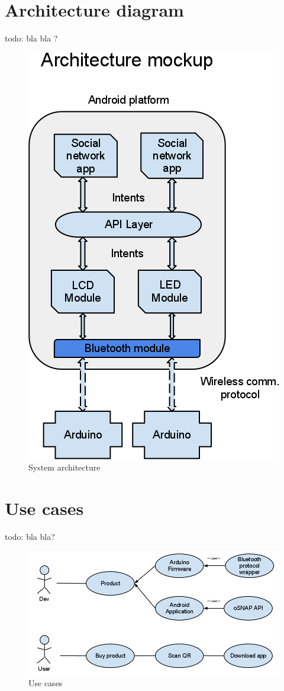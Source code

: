 \section{Architecture diagram}
todo: bla bla ?
\begin{figure}[hb!]
\centering \includegraphics[scale=0.50]{img/architecture-diagram.png}
\caption{System architecture}
\label{fig:architecture}
\end{figure}

\newpage
\section{Use cases}
todo: bla bla?
\begin{figure}[hb!]
\centering \includegraphics[scale=0.50]{img/use-cases.png}
\caption{Use cases}
\label{fig:architecture}
\end{figure}